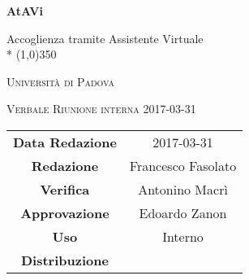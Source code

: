 \documentclass[a4paper,12pt]{article}
\author{Francesco Fasolato}
\date{2017/03/31}
\begin{document}
\begin{titlepage}
	\centering
	{\huge\bfseries AtAVi\par}
	Accoglienza tramite Assistente Virtuale \\*
	\line(1,0){350} \\
	{\scshape\LARGE Università di Padova \par}
	\vspace{1cm}
	{\scshape\Large Verbale Riunione interna 2017-03-31\par}
	\vspace{1.5cm}
	\logo
	\vspace{2cm}	
	\vfill \vfill
	\begin{tabular}{c|c}
		{\hfill\textbf{Data Redazione}} 		& 2017-03-31	\\
		{\hfill\textbf{Redazione}} 				& Francesco Fasolato		\\
		{\hfill\textbf{Verifica}} 				& Antonino Macrì 	\\
		{\hfill\textbf{Approvazione}} 			& Edoardo Zanon  \\
		{\hfill\textbf{Uso}} 					& Interno		\\
		{\hfill\textbf{Distribuzione}} 			& \kpanic\		\\
	\end{tabular}
\end{titlepage}

	\pagestyle{myfront}
	\newpage
	\tableofcontents
	
	\label{LastFrontPage}
	
	\newpage
	\pagestyle{mymain}
		
		
		
		
		
		
		
		
	
	\label{LastPage}
\end{document}
